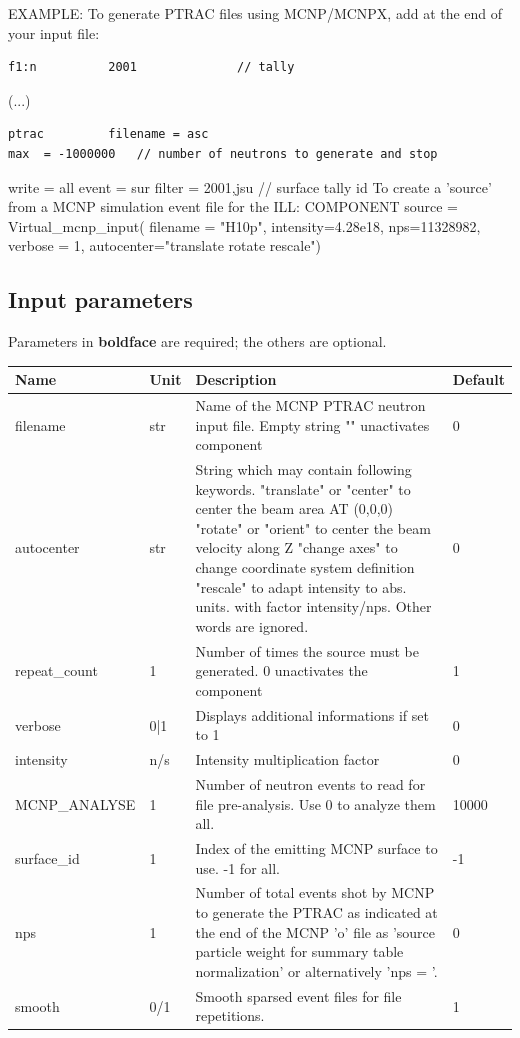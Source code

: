 EXAMPLE: To generate PTRAC files using MCNP/MCNPX, add at the end of your input file:

\begin{verbatim}
f1:n          2001              // tally
\end{verbatim}

(...)

\begin{verbatim}
ptrac         filename = asc
max  = -1000000   // number of neutrons to generate and stop
\end{verbatim}

write = all event = sur filter = 2001,jsu // surface tally id To create a 'source' from a MCNP simulation event file for the ILL: COMPONENT source = Virtual\_mcnp\_input( filename = "H10p", intensity=4.28e18, nps=11328982, verbose = 1, autocenter="translate rotate rescale")

\subsection*{Input parameters}
Parameters in \textbf{boldface} are required; the others are optional.

\begin{longtable}{p{}p{}p{}p{}}
\toprule
\textbf{Name} & \textbf{Unit} & \textbf{Description} & \textbf{Default} \\
\midrule
\endhead
filename & str & Name of the MCNP PTRAC neutron input file. Empty string "" unactivates component & 0 \\
autocenter & str & String which may contain following keywords. "translate" or "center"  to center the beam area AT (0,0,0) "rotate"    or "orient"  to center the beam velocity along Z "change axes"            to change coordinate system definition "rescale"                to adapt intensity to abs. units. with factor intensity/nps. Other words are ignored. & 0 \\
repeat\_count & 1 & Number of times the source must be generated. 0 unactivates the component & 1 \\
verbose & 0|1 & Displays additional informations if set to 1 & 0 \\
intensity & n/s & Intensity multiplication factor & 0 \\
MCNP\_ANALYSE & 1 & Number of neutron events to read for file pre-analysis. Use 0 to analyze them all. & 10000 \\
surface\_id & 1 & Index of the emitting MCNP surface to use. -1 for all. & -1 \\
nps & 1 & Number of total events shot by MCNP to generate the PTRAC as indicated at the end of the MCNP 'o' file as 'source particle weight for summary table normalization' or alternatively 'nps = '. & 0 \\
smooth & 0/1 & Smooth sparsed event files for file repetitions. & 1 \\
\bottomrule
\end{longtable}

